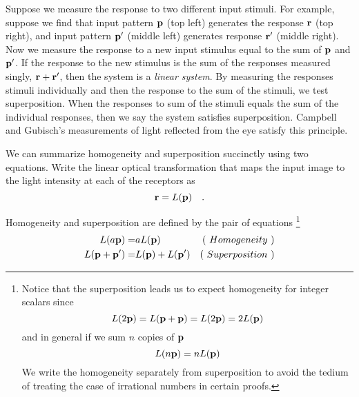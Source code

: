 Suppose we measure the response to two different input stimuli.
For example, suppose we find
that input pattern $\mbox {$\bf p$}$ (top left) generates the
response $\mbox {$\bf r$}$ (top right),
and input pattern $\mbox {$\bf p$} '$ (middle left) generates
response $\mbox {$\bf r$} '$ (middle right).
Now we measure the response
to a new input stimulus equal to the sum of $\mbox {$\bf p$}$ and $\mbox {$\bf p$} '$.
If the response to the new stimulus
is the sum of the responses measured singly, $\mbox {$\bf r$}  + \mbox {$\bf r$} ' $,
then the system is a {\em linear system}.
By measuring
the responses stimuli individually and then the
response to the sum of the stimuli, we test superposition.
When the responses to sum of the stimuli equals the sum of
the individual responses,
then we say the system satisfies superposition.
Campbell and Gubisch's measurements of light reflected from
the eye satisfy this principle.

We can summarize homogeneity and superposition
succinctly using two equations.
Write the linear optical transformation that maps the input image to the
light intensity at each of the receptors as
\begin{equation}
\mbox {$\bf r$} = L ( \mbox {$\bf p$} ) ~~~.
\end{equation}

Homogeneity and superposition are defined by the pair of equations
\footnote{Notice that 
the superposition leads us to expect
homogeneity for integer scalars since
\[
L( 2 \mbox {$\bf p$}) = 
 L ( \mbox {$\bf p$} + \mbox {$\bf p$} ) = 
 L ( 2 \mbox {$\bf p$} ) = 
 2 L ( \mbox {$\bf p$} ) \nonumber
\]
and in general if we sum $n$ copies of $\mbox {$\bf p$}$
\[
L ( n \mbox {$\bf p$} ) = n L ( \mbox {$\bf p$} )
\]
We write the homogeneity separately from superposition
to avoid the tedium of treating the case of irrational numbers
in certain proofs.}
\begin{eqnarray}
L ( a \mbox {$\bf p$} ) = & a L ( \mbox {$\bf p$} ) &  (~Homogeneity~) \\
L ( \mbox {$\bf p$} + \mbox {$\bf p$} ' ) = & L ( \mbox {$\bf p$} ) + L ( \mbox {$\bf p$} ' ) & (~Superposition~)
\end{eqnarray}

